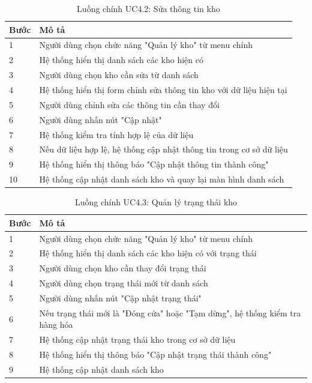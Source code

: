 \documentclass[a4paper,12pt]{article}
\begin{document}
\begin{table}[h]
\centering
\renewcommand{\arraystretch}{0.85}
\begin{tabular}{|p{1.5cm}|p{10cm}|}
\hline
\textbf{Bước} & \textbf{Mô tả} \\
\hline
1 & Người dùng chọn chức năng "Quản lý kho" từ menu chính \\
\hline
2 & Hệ thống hiển thị danh sách các kho hiện có \\
\hline
3 & Người dùng chọn kho cần sửa từ danh sách \\
\hline
4 & Hệ thống hiển thị form chỉnh sửa thông tin kho với dữ liệu hiện tại \\
\hline
5 & Người dùng chỉnh sửa các thông tin cần thay đổi \\
\hline
6 & Người dùng nhấn nút "Cập nhật" \\
\hline
7 & Hệ thống kiểm tra tính hợp lệ của dữ liệu \\
\hline
8 & Nếu dữ liệu hợp lệ, hệ thống cập nhật thông tin trong cơ sở dữ liệu \\
\hline
9 & Hệ thống hiển thị thông báo "Cập nhật thông tin thành công" \\
\hline
10 & Hệ thống cập nhật danh sách kho và quay lại màn hình danh sách \\
\hline
\end{tabular}
\caption{Luồng chính UC4.2: Sửa thông tin kho}
\end{table}

\begin{table}[h]
\centering
\renewcommand{\arraystretch}{0.85}
\begin{tabular}{|p{1.5cm}|p{10cm}|}
\hline
\textbf{Bước} & \textbf{Mô tả} \\
\hline
1 & Người dùng chọn chức năng "Quản lý kho" từ menu chính \\
\hline
2 & Hệ thống hiển thị danh sách các kho hiện có với trạng thái \\
\hline
3 & Người dùng chọn kho cần thay đổi trạng thái \\
\hline
4 & Người dùng chọn trạng thái mới từ danh sách \\
\hline
5 & Người dùng nhấn nút "Cập nhật trạng thái" \\
\hline
6 & Nếu trạng thái mới là "Đóng cửa" hoặc "Tạm dừng", hệ thống kiểm tra hàng hóa \\
\hline
7 & Hệ thống cập nhật trạng thái kho trong cơ sở dữ liệu \\
\hline
8 & Hệ thống hiển thị thông báo "Cập nhật trạng thái thành công" \\
\hline
9 & Hệ thống cập nhật danh sách kho \\
\hline
\end{tabular}
\caption{Luồng chính UC4.3: Quản lý trạng thái kho}
\end{table}
\end{document}
